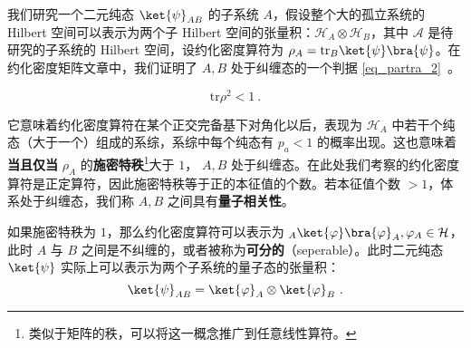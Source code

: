 

我们研究一个二元纯态 $\ket{\psi}_{AB}$ 的子系统 $A$，假设整个大的孤立系统的 Hilbert 空间可以表示为两个子 Hilbert 空间的张量积：$\mathcal{H}_A\otimes \mathcal{H}_B$，其中 $\mathcal A$ 是待研究的子系统的 Hilbert 空间，设约化密度算符为 $\rho_A=\text{tr}_B \ket{\psi}\bra{\psi}$。在约化密度矩阵文章中，我们证明了 $A,B$ 处于纠缠态的一个判据 \autoref{eq_partra_2}~。

\begin{equation}
\text{tr} \rho^2 <1~.
\end{equation}

它意味着约化密度算符在某个正交完备基下对角化以后，表现为 $\mathcal{H}_A$ 中若干个纯态（大于一个）组成的系综，系综中每个纯态有 $p_a<1$ 的概率出现。这也意味着\textbf{当且仅当} $\rho_A$ 的\textbf{施密特秩}\footnote{类似于矩阵的秩，可以将这一概念推广到任意线性算符。}大于 $1$， $A,B$ 处于纠缠态。在此处我们考察的约化密度算符是正定算符，因此施密特秩等于正的本征值的个数。若本征值个数 $>1$，体系处于纠缠态，我们称 $A,B$ 之间具有\textbf{量子相关性}。

如果施密特秩为 $1$，那么约化密度算符可以表示为 ${}_A\ket{\varphi}\bra{\varphi}_A,\varphi_A\in \mathcal{H}$，此时 $A$ 与 $B$ 之间是不纠缠的，或者被称为\textbf{可分的}（seperable）。此时二元纯态 $\ket{\psi}$ 实际上可以表示为两个子系统的量子态的张量积：
\begin{equation}
\ket{\psi}_{AB}=\ket{\varphi}_A\otimes \ket{\varphi}_B~.
\end{equation}
